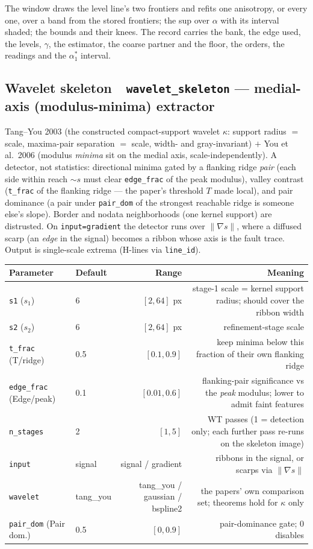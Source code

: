 \documentclass[10pt]{article}
\newcommand{\dev}[1]{\texttt{#1}}
\newcommand{\tool}[2]{#1~\textperiodcentered~\dev{#2}}
\begin{document}
The window draws the level line's two frontiers and refits one anisotropy, or every one, over a band from
the stored frontiers; the sup over $\alpha$ with its interval shaded; the bounds and their knees. The
record carries the bank, the edge used, the levels, $\gamma$, the estimator, the coarse partner and the
floor, the orders, the readings and the $\alpha_1^*$ interval.

\subsection{\tool{Wavelet skeleton}{wavelet\_skeleton} --- medial-axis (modulus-minima) extractor}
Tang--You 2003 (the constructed compact-support wavelet $\kappa$: support radius $=$
scale, maxima-pair separation $=$ scale, width- and gray-invariant) $+$ You et al.\ 2006
(modulus \emph{minima} sit on the medial axis, scale-independently). A detector, not
statistics: directional minima gated by a flanking ridge \emph{pair} (each side within
reach $\sim s$ must clear \texttt{edge\_frac} of the peak modulus), valley contrast
(\texttt{t\_frac} of the flanking ridge --- the paper's threshold $T$ made local), and
pair dominance (a pair under \texttt{pair\_dom} of the strongest reachable ridge is
someone else's slope). Border and nodata neighborhoods (one kernel support) are
distrusted. On \texttt{input=gradient} the detector runs over $\lVert\nabla s\rVert$,
where a diffused scarp (an \emph{edge} in the signal) becomes a ribbon whose axis is the
fault trace. Output is single-scale extrema (H-lines via \texttt{line\_id}).

\begin{longtable}{P l R N}
\toprule Parameter & Default & Range & Meaning \\ \midrule
\texttt{s1} ($s_1$) & 6 & $[2,64]$ px & stage-1 scale = kernel support radius; should cover the ribbon width \\
\texttt{s2} ($s_2$) & 6 & $[2,64]$ px & refinement-stage scale \\
\texttt{t\_frac} (T/ridge) & 0.5 & $[0.1,0.9]$ & keep minima below this fraction of their own flanking ridge \\
\texttt{edge\_frac} (Edge/peak) & 0.1 & $[0.01,0.6]$ & flanking-pair significance vs the \emph{peak} modulus; lower to admit faint features \\
\texttt{n\_stages} & 2 & $[1,5]$ & WT passes (1 = detection only; each further pass re-runs on the skeleton image) \\
\texttt{input} & signal & signal / gradient & ribbons in the signal, or scarps via $\lVert\nabla s\rVert$ \\
\texttt{wavelet} & tang\_you & tang\_you / gaussian / bspline2 & the papers' own comparison set; theorems hold for $\kappa$ only \\
\texttt{pair\_dom} (Pair dom.) & 0.5 & $[0,0.9]$ & pair-dominance gate; $0$ disables \\
\bottomrule
\end{longtable}
\end{document}
